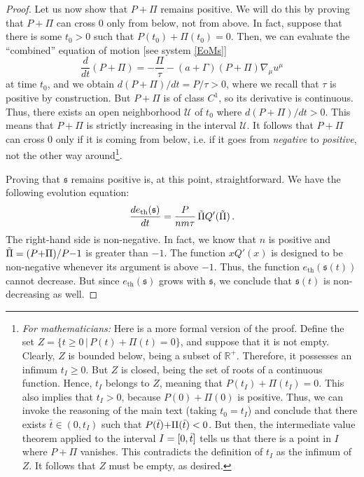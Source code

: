 \documentclass[a4paper, amsfonts, amssymb, amsmath, reprint, showkeys, nofootinbib, twoside,notitlepage,onecolumn]{revtex4-2}
\newcommand{\s}{{\mathfrak{s}}}
\theoremstyle{definition}
\theoremstyle{theorem}
\theoremstyle{corollary}
\begin{document}
\begin{proof}
Let us now show that $P{+}\Pi$ remains positive. We will do this by proving that $P{+}\Pi$ can cross 0 only from below, not from above. In fact, suppose that there is some $t_0>0$ such that $P(t_0)+\Pi(t_0)=0$. Then, we can evaluate the ``combined'' equation of motion [see system \eqref{EoMs}]
\begin{equation}\label{dPpPi}
\dfrac{d}{dt} (P{+}\Pi)=-\dfrac{\Pi}{\tau}-(a{+}\Gamma)(P{+}\Pi)\nabla_\mu u^\mu 
\end{equation}
at time $t_0$, and we obtain $d (P{+}\Pi)/dt=P/\tau>0$, where we recall that $\tau$ is positive by construction. But $P+\Pi$ is of class $C^1$, so its derivative is continuous. Thus, there exists an open neighborhood $\mathcal{U}$ of $t_0$ where $d(P{+}\Pi)/dt>0$. This means that $P{+}\Pi$ is strictly increasing in the interval $\mathcal{U}$. It follows that $P{+}\Pi$ can cross 0 only if it is coming from below, i.e. if it goes from \textit{negative} to \textit{positive}, not the other way around\footnote{\textit{For mathematicians:} Here is a more formal version of the proof. Define the set $Z=\{t\geq 0 \, |\, P(t){+}\Pi(t)=0 \}$, and suppose that it is not empty. Clearly, $Z$ is bounded below, being a subset of $\mathbb{R}^+$. Therefore, it possesses an infimum $t_I \geq 0$. But $Z$ is closed, being the set of roots of a continuous function. Hence, $t_I$ belongs to $Z$, meaning that $P(t_I){+}\Pi(t_I)=0$. This also implies that $t_I>0$, because $P(0){+}\Pi(0)$ is positive. Thus, we can invoke the reasoning of the main text (taking $t_0 =t_I$) and conclude that there exists $\bar{t}\in (0,t_I)$ such that $P(\Bar{t}){+}\Pi(\Bar{t})<0$. But then, the intermediate value theorem applied to the interval $I=[0,\Bar{t}]$ tells us that there is a point in $I$ where $P{+}\Pi$ vanishes. This contradicts the definition of $t_I$ as the infimum of $Z$. It follows that $Z$ must be empty, as desired.}.

Proving that $\s$ remains positive is, at this point, straightforward. We have the following evolution equation:
\begin{equation}
\dfrac{d e_\text{th}(\s)}{dt} = \dfrac{P}{nm\tau} \, \Tilde{\Pi} Q'(\Tilde{\Pi}) \, .
\end{equation}
The right-hand side is non-negative. In fact, we know that $n$ is positive and $\Tilde{\Pi}=(P{+}\Pi)/P{-}1 $ is greater than $-1$. The function $xQ'(x)$ is designed to be non-negative whenever its argument is above $-1$. Thus, the function $e_\text{th}(\s(t))$ cannot decrease. But since $e_\text{th}(\s)$ grows with $\s$, we conclude that $\s(t)$ is non-decreasing as well.
\end{proof}
\end{document}
